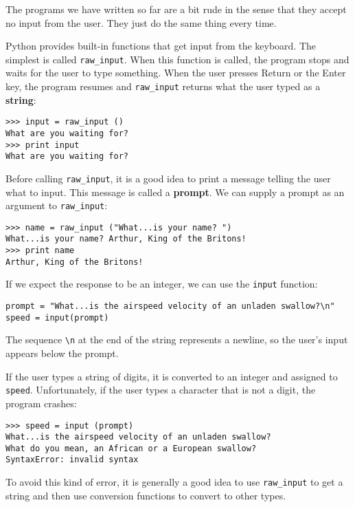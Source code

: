 The programs we have written so far are a bit rude in the sense that
they accept no input from the user.  They just do the same thing every
time.

Python provides built-in functions that get input from the keyboard.
The simplest is called {\tt raw\_input}.  When this function is
called, the program stops and waits for the user to type something.
When the user presses Return or the Enter key, the program resumes and
{\tt raw\_input} returns what the user typed as a {\bf string}:

\beforeverb
\begin{verbatim}
>>> input = raw_input ()
What are you waiting for?
>>> print input
What are you waiting for?
\end{verbatim}
\afterverb
%
Before calling {\tt raw\_input}, it is a good idea to print a message
telling the user what to input.  This message is called a {\bf
prompt}.  We can supply a prompt as an argument to {\tt raw\_input}:


\beforeverb
\begin{verbatim}
>>> name = raw_input ("What...is your name? ")
What...is your name? Arthur, King of the Britons!
>>> print name
Arthur, King of the Britons!
\end{verbatim}
\afterverb
%
If we expect the response to be an integer, we can use the
{\tt input} function:

\beforeverb
\begin{verbatim}
prompt = "What...is the airspeed velocity of an unladen swallow?\n"
speed = input(prompt)
\end{verbatim}
\afterverb
%
The sequence \verb+\n+ at the end of the string represents a newline,
so the user's input appears below the prompt.

If the user types a string of digits, it is converted to an
integer and assigned to {\tt speed}.  Unfortunately, if the user
types a character that is not a digit, the program crashes:

\beforeverb
\begin{verbatim}
>>> speed = input (prompt)
What...is the airspeed velocity of an unladen swallow?
What do you mean, an African or a European swallow?
SyntaxError: invalid syntax
\end{verbatim}
\afterverb
%
To avoid this kind of error, it is generally a good idea to
use {\tt raw\_input} to get a string and then use conversion
functions to convert to other types.


